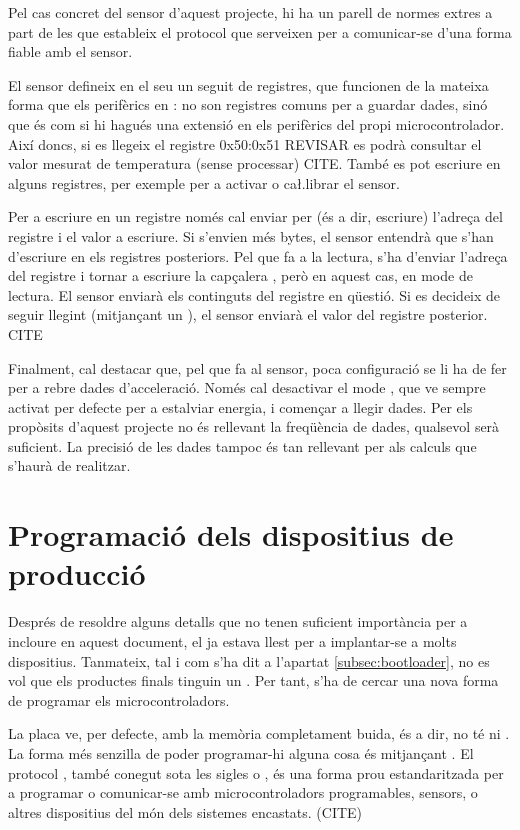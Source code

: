 Pel cas concret del sensor d'aquest projecte, hi ha un parell de normes extres
a part de les que estableix el protocol  que serveixen per a comunicar-se
d'una forma fiable amb el sensor.

El sensor  defineix en el seu  un seguit de
registres, que funcionen de la mateixa forma que els perifèrics en :
no son registres comuns per a guardar dades, sinó que és com si hi hagués una
extensió en els perifèrics del propi microcontrolador. Així doncs, si es llegeix
el registre 0x50:0x51 REVISAR es podrà consultar el valor mesurat de temperatura
(sense processar) CITE. També es pot escriure en alguns registres, per exemple
per a activar o ca\l.librar el sensor.

Per a escriure en un registre només cal enviar per  (és a dir, escriure)
l'adreça del registre i el valor a escriure. Si s'envien més bytes, el sensor
entendrà que s'han d'escriure en els registres posteriors. Pel que fa a la lectura,
s'ha d'enviar l'adreça del registre i tornar a escriure la capçalera ,
però en aquest cas, en mode de lectura. El sensor enviarà els continguts del
registre en qüestió. Si es decideix de seguir llegint (mitjançant un ),
el sensor enviarà el valor del registre posterior. CITE

Finalment, cal destacar que, pel que fa al sensor, poca configuració se li ha de
fer per a rebre dades d'acceleració. Només cal desactivar el mode ,
que ve sempre activat per defecte per a estalviar energia, i començar a llegir
dades. Per els propòsits d'aquest projecte no és rellevant la freqüència de
dades, qualsevol serà suficient. La precisió de les dades tampoc és tan rellevant
per als calculs que s'haurà de realitzar.

\section{Programació dels dispositius de producció}

Després de resoldre alguns detalls que no tenen suficient importància per a
incloure en aquest document, el  ja estava llest per a 
implantar-se a molts dispositius. Tanmateix, tal i com s'ha dit a
l'apartat \ref{subsec:bootloader}, no es vol que els productes finals tinguin
un . Per tant, s'ha de cercar una nova forma de programar
els microcontroladors.

La placa  ve, per defecte, amb la memòria  completament
buida, és a dir, no té ni . La forma més senzilla de poder
programar-hi alguna cosa és mitjançant . El protocol
, també conegut sota les sigles  o
, és una forma prou estandaritzada per a
programar o comunicar-se amb microcontroladors programables, sensors, o altres
dispositius del món dels sistemes encastats. (CITE)

